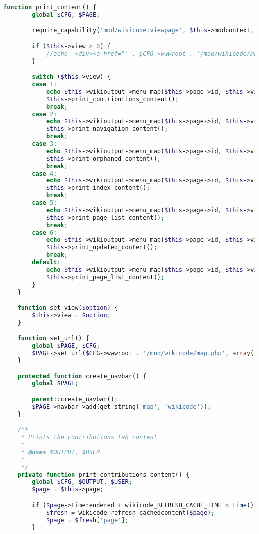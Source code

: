 \begin{lstlisting}[language=PHP]
    function print_content() {
        global $CFG, $PAGE;

        require_capability('mod/wikicode:viewpage', $this->modcontext, NULL, true, 'noviewpagepermission', 'wikicode');

        if ($this->view > 0) {
            //echo '<div><a href="' . $CFG->wwwroot . '/mod/wikicode/map.php?pageid=' . $this->page->id . '">' . get_string('backtomapmenu', 'wikicode') . '</a></div>';
        }

        switch ($this->view) {
        case 1:
            echo $this->wikioutput->menu_map($this->page->id, $this->view);
            $this->print_contributions_content();
            break;
        case 2:
            echo $this->wikioutput->menu_map($this->page->id, $this->view);
            $this->print_navigation_content();
            break;
        case 3:
            echo $this->wikioutput->menu_map($this->page->id, $this->view);
            $this->print_orphaned_content();
            break;
        case 4:
            echo $this->wikioutput->menu_map($this->page->id, $this->view);
            $this->print_index_content();
            break;
        case 5:
            echo $this->wikioutput->menu_map($this->page->id, $this->view);
            $this->print_page_list_content();
            break;
        case 6:
            echo $this->wikioutput->menu_map($this->page->id, $this->view);
            $this->print_updated_content();
            break;
        default:
            echo $this->wikioutput->menu_map($this->page->id, $this->view);
            $this->print_page_list_content();
        }
    }

    function set_view($option) {
        $this->view = $option;
    }

    function set_url() {
        global $PAGE, $CFG;
        $PAGE->set_url($CFG->wwwroot . '/mod/wikicode/map.php', array('pageid' => $this->page->id));
    }

    protected function create_navbar() {
        global $PAGE;

        parent::create_navbar();
        $PAGE->navbar->add(get_string('map', 'wikicode'));
    }

    /**
     * Prints the contributions tab content
     *
     * @uses $OUTPUT, $USER
     *
     */
    private function print_contributions_content() {
        global $CFG, $OUTPUT, $USER;
        $page = $this->page;

        if ($page->timerendered + wikicode_REFRESH_CACHE_TIME < time()) {
            $fresh = wikicode_refresh_cachedcontent($page);
            $page = $fresh['page'];
        }


\end{lstlisting}
